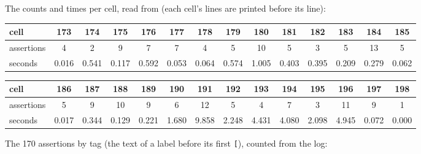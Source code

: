 The counts and times per cell, read from  (each cell's
 lines are printed before its  line):

\begin{center}
{\footnotesize
\setlength{\tabcolsep}{3pt}
\begin{tabular}{@{}lccccccccccccc@{}}
\toprule
cell & 173 & 174 & 175 & 176 & 177 & 178 & 179 & 180 & 181 & 182 & 183 & 184 & 185 \\
\midrule
assertions & 4 & 2 & 9 & 7 & 7 & 4 & 5 & 10 & 5 & 3 & 5 & 13 & 5 \\
seconds & 0.016 & 0.541 & 0.117 & 0.592 & 0.053 & 0.064 & 0.574 & 1.005 & 0.403 & 0.395 & 0.209 & 0.279 & 0.062 \\
\bottomrule
\end{tabular}

\medskip
\begin{tabular}{@{}lccccccccccccc@{}}
\toprule
cell & 186 & 187 & 188 & 189 & 190 & 191 & 192 & 193 & 194 & 195 & 196 & 197 & 198 \\
\midrule
assertions & 5 & 9 & 10 & 9 & 6 & 12 & 5 & 4 & 7 & 3 & 11 & 9 & 1 \\
seconds & 0.017 & 0.344 & 0.129 & 0.221 & 1.680 & 9.858 & 2.248 & 4.431 & 4.080 & 2.098 & 4.945 & 0.072 & 0.000 \\
\bottomrule
\end{tabular}
}
\end{center}

The 170 assertions by tag (the text of a label before its first \texttt{[}), counted from the log:

